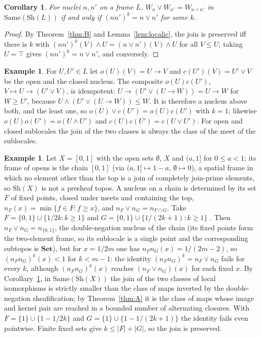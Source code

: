 \documentclass[11pt]{amsart}
\newtheorem{cor}[thm]{Corollary}
\theoremstyle{definition}
\newtheorem{ex}[thm]{Example}
\newcommand{\Same}{\mathrm{Same}}
\newcommand{\Sh}{\mathrm{Sh}}
\begin{document}
\begin{cor}\label{cor:localic}
For nuclei $n,n'$ on a frame $L$, $W_n\vee W_{n'}=W_{n\vee n'}$ in
$\Same(\Sh(L))$ if and only if $(nn')^k=n\vee n'$ for some $k$.
\end{cor}
\begin{proof}
By Theorem~\ref{thm:B} and Lemma~\ref{lem:localic}, the join is preserved
iff there is $k$ with $(nn')^k(V)\wedge U=(n\vee n')(V)\wedge U$ for all
$V\le U$; taking $U=\top$ gives $(nn')^k=n\vee n'$, and conversely.
\end{proof}

\begin{ex}
For $U,U'\in L$ let $o(U)(V)=U\to V$ and $c(U')(V)=U'\vee V$ be the open and
the closed nucleus. The composite $o(U)c(U')$, $V\mapsto U\to(U'\vee V)$, is
idempotent: $U\to(U'\vee(U\to W))=U\to W$ for $W\ge U'$, because
$U\wedge(U'\vee(U\to W))\le W$. It is therefore a nucleus above both, and
the least one, so $o(U)\vee c(U')=o(U)c(U')$ with $k=1$; likewise
$o(U)o(U')=o(U\wedge U')$ and $c(U)c(U')=c(U\vee U')$. For open and closed
sublocales the join of the two classes is always the class of the meet of
the sublocales.
\end{ex}

\begin{ex}\label{ex:chain}
Let $X=[0,1]$ with the open sets $\emptyset$, $X$ and $(a,1]$ for
$0\le a<1$; its frame of opens is the chain $[0,1]$ (via $(a,1]\mapsto1-a$,
$\emptyset\mapsto0$), a spatial frame in which no element other than the top
is a join of completely join-prime elements, so $\Sh(X)$ is not a presheaf
topos. A nucleus on a chain is determined by its set $F$ of fixed points,
closed under meets and containing the top, $n_F(x)=\min\{f\in F:f\ge x\}$,
and $n_F\vee n_G=n_{F\cap G}$. Take $F=\{0,1\}\cup\{1/2k:k\ge1\}$ and
$G=\{0,1\}\cup\{1/(2k+1):k\ge1\}$ \cite[Ex.~5.3]{Fuzzysame}. Then
$n_F\vee n_G=n_{\{0,1\}}$, the double-negation nucleus of the chain (its
fixed points form the two-element frame, so its sublocale is a single point
and the corresponding subtopos is $\mathbf{Set}$), but
for $x=1/2m$ one has $n_Fn_G(x)=1/(2m-2)$, so $(n_Fn_G)^k(x)<1$ for
$k<m-1$: the identity $(n_Fn_G)^k=n_F\vee n_G$ fails for every $k$, although
$(n_Fn_G)^k(x)$ reaches $(n_F\vee n_G)(x)$ for each fixed $x$. By
Corollary~\ref{cor:localic}, in $\Same(\Sh(X))$ the join of the two classes
of local isomorphisms is strictly smaller than the class of maps inverted by
the double-negation sheafification; by Theorem~\ref{thm:A} it
is the class of maps whose image and kernel pair are reached in a bounded
number of alternating closures. With $F=\{1\}\cup\{1-1/2k\}$ and
$G=\{1\}\cup\{1-1/(2k+1)\}$ the identity fails even pointwise. Finite fixed
sets give $k\le|F|+|G|$, so the join is preserved.
\end{ex}
\end{document}
